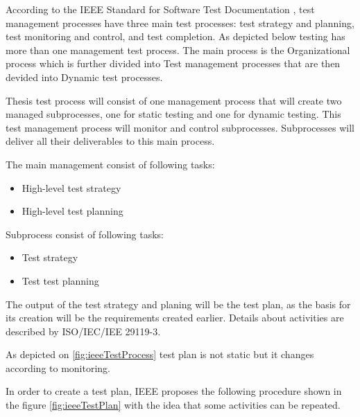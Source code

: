 





According to the IEEE Standard for Software Test Documentation \cite{ieeeTestProcess}, test management processes have three main test processes: test strategy and planning, test monitoring and control, and test completion.
As depicted below testing has more than one management test process. The main process is the Organizational process which is further divided into Test management processes that are then devided into Dynamic test processes.


Thesis test process will consist of one management process that will create two managed subprocesses, one for static testing and one for dynamic testing. This test management process will monitor and control subprocesses. Subprocesses will deliver all their deliverables to this main process.

The main management consist of following tasks:
\begin{itemize}
    \item High-level test strategy
    \item High-level test planning
\end{itemize}

Subprocess consist of following tasks:
\begin{itemize}
    \item Test strategy
    \item Test test planning
\end{itemize}

The output of the test strategy and planing will be the test plan, as the basis for its creation will be the requirements created earlier. Details about activities are described by ISO/IEC/IEE 29119-3.

As depicted on \ref{fig:ieeeTestProcess} test plan is not static but it changes according to monitoring.


In order to create a test plan, IEEE proposes the following procedure shown in the figure \ref{fig:ieeeTestPlan} with the idea that some activities can be repeated.

